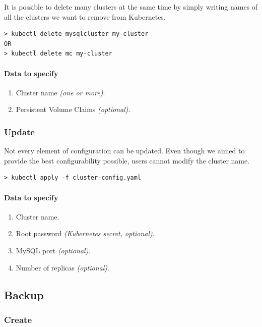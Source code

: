 It is possible to delete many clusters at the same time by simply writing
names of all the clusters we want to remove from Kubernetes.

\begin{lstlisting}
> kubectl delete mysqlcluster my-cluster
OR
> kubectl delete mc my-cluster
\end{lstlisting}

\paragraph{Data to specify}
\begin{enumerate}
	\item Cluster name \textit{(one or more)}.
	\item Persistent Volume Claims \textit{(optional)}.
\end{enumerate}

\subsubsection*{Update}

Not every element of configuration can be updated. Even though we aimed 
to provide the best configurability possible, users cannot modify the
cluster name.

\begin{lstlisting}
> kubectl apply -f cluster-config.yaml
\end{lstlisting}

\paragraph{Data to specify}
\begin{enumerate}
	\item Cluster name.
	\item Root password \textit{(Kubernetes secret, optional)}.
	\item MySQL port \textit{(optional)}.
	\item Number of replicas \textit{(optional)}.
\end{enumerate}

\subsection{Backup}
\subsubsection*{Create}

